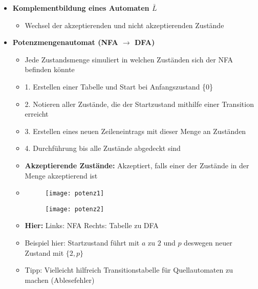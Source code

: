 \begin{itemize}
\begin{itemize}
	\end{itemize}
	
	
\item {\large \textbf{Komplementbildung eines Automaten $\bar{L}$}}
	\begin{itemize}
	\item Wechsel der akzeptierenden und nicht akzeptierenden Zustände
	\end{itemize}
		
		
\item {\large \textbf{Potenzmengenautomat (NFA $\rightarrow$ DFA)}}
	\begin{itemize}
	\item Jede Zustandsmenge simuliert in welchen Zuständen sich der NFA befinden könnte
	\item 1. Erstellen einer Tabelle und Start bei Anfangszustand \{0\}
	\item 2. Notieren aller Zustände, die der Startzustand mithilfe einer Transition erreicht
	\item 3. Erstellen eines neuen Zeileneintrags mit dieser Menge an Zuständen
	\item 4. Durchführung bis alle Zustände abgedeckt sind
	\item \textbf{Akzeptierende Zustände:} Akzeptiert, falls einer der Zustände in der Menge akzeptierend ist
	\item[]
		\begin{minipage}{0.55\textwidth}
				\begin{figure}[H]
				\texttt{[image: potenz1]}
				\end{figure}
			\end{minipage}
			\begin{minipage}[t]{0.35\textwidth}
				\vspace{-2.25cm}
				\begin{figure}[H]
				\texttt{[image: potenz2]}
				\end{figure}
			\end{minipage}
	\item \textbf{Hier:} Links: NFA    Rechts: Tabelle zu DFA
	\item Beispiel hier: Startzustand führt mit $a$ zu $2$ und $p$ deswegen neuer Zustand mit $\{2,p\}$	
	\item Tipp: Vielleicht hilfreich Transitionstabelle für Quellautomaten zu machen (Ablesefehler)
	
	\end{itemize}

\pagebreak


\end{itemize}
